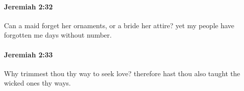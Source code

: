 		\paragraph{Jeremiah 2:32} %
			\label{JEREMIAH-2-32}

			Can a maid forget her ornaments, or a bride her attire? yet my people have forgotten me days without number.


		\paragraph{Jeremiah 2:33} %
			\label{JEREMIAH-2-33}

			Why trimmest thou thy way to seek love? therefore hast thou also taught the wicked ones thy ways.


